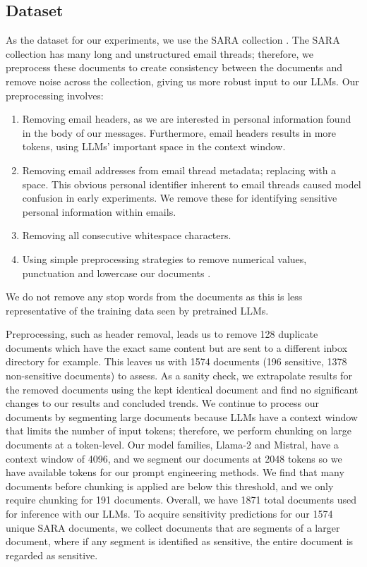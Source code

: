 \subsection{Dataset}
As the dataset for our experiments, we use the SARA collection \cite{mckechnie2024sara}. The SARA collection has many long and unstructured email threads; therefore, we preprocess these documents to create consistency between the documents and remove noise across the collection, giving us more robust input to our LLMs. Our preprocessing involves:
\begin{enumerate}
    \item Removing email headers, as we are interested in personal information found in the body of our messages. Furthermore, email headers results in more tokens, using LLMs' important space in the context window.
    \item Removing email addresses from email thread metadata; replacing {\em@} with a space. This obvious personal identifier inherent to email threads caused model confusion in early experiments. We remove these for identifying sensitive personal information within emails.
    \item Removing all consecutive whitespace characters.
    \item Using simple preprocessing strategies to remove numerical values, punctuation and lowercase our documents \cite{rehurek2011gensim}.
\end{enumerate}

We do not remove any stop words from the documents as this is less representative of the training data seen by pretrained LLMs.

Preprocessing, such as header removal, leads us to remove 128 duplicate documents which have the exact same content but are sent to a different inbox directory for example. This leaves us with 1574 documents (196 sensitive, 1378 non-sensitive documents) to assess. As a sanity check, we extrapolate results for the removed documents using the kept identical document and find no significant changes to our results and concluded trends. We continue to process our documents by segmenting large documents because LLMs have a context window that limits the number of input tokens; therefore, we perform chunking on large documents at a token-level. Our model families, Llama-2 and Mistral, have a context window of 4096, and we segment our documents at 2048 tokens so we have available tokens for our prompt engineering methods. We find that many documents before chunking is applied are below this threshold, and we only require chunking for 191 documents. Overall, we have 1871 total documents used for inference with our LLMs. To acquire sensitivity predictions for our 1574 unique SARA documents, we collect documents that are segments of a larger document, where if any segment is identified as sensitive, the entire document is regarded as sensitive.

